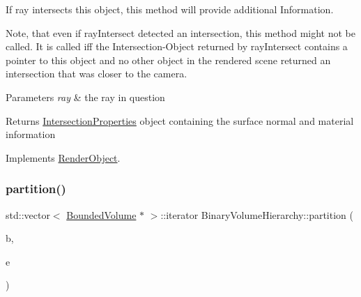 If ray intersects this object, this method will provide additional Information. 

Note, that even if ray\+Intersect detected an intersection, this method might not be called. It is called iff the Intersection-\/\+Object returned by ray\+Intersect contains a pointer to this object and no other object in the rendered scene returned an intersection that was closer to the camera.


\begin{DoxyParams}{Parameters}
{\em ray} & the ray in question \\
\hline
\end{DoxyParams}
\begin{DoxyReturn}{Returns}
\mbox{\hyperlink{classIntersectionProperties}{Intersection\+Properties}} object containing the surface normal and material information 
\end{DoxyReturn}


Implements \mbox{\hyperlink{classRenderObject_a792d36570e3264530872187ca1b0baca}{Render\+Object}}.

\mbox{\label{classBinaryVolumeHierarchy_ab30dec4aa6ef808f53bbdedb98d8af65}} 
\subsubsection{\texorpdfstring{partition()}{partition()}}
{\footnotesize\ttfamily std\+::vector$<$ \mbox{\hyperlink{classBoundedVolume}{Bounded\+Volume}} $\ast$ $>$\+::iterator Binary\+Volume\+Hierarchy\+::partition (\begin{DoxyParamCaption}\item[{std\+::vector$<$ \mbox{\hyperlink{classBoundedVolume}{Bounded\+Volume}} $\ast$ $>$\+::iterator}]{b,  }\item[{std\+::vector$<$ \mbox{\hyperlink{classBoundedVolume}{Bounded\+Volume}} $\ast$ $>$\+::iterator}]{e }\end{DoxyParamCaption})\hspace{0.3cm}{\ttfamily [private]}}

\mbox{\label{classBinaryVolumeHierarchy_ad92d27372aef59591ddc239685ca770d}} 
